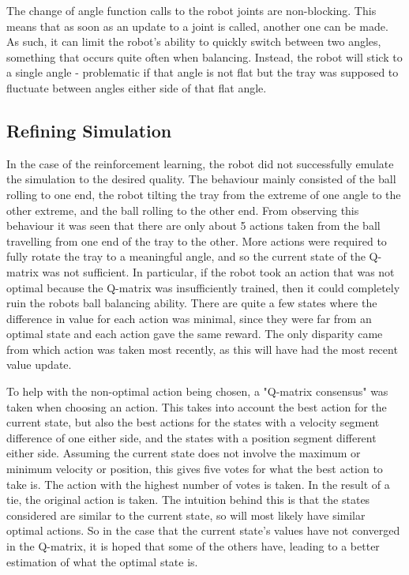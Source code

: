 \documentclass[12pt,a4paper]{article}
\begin{document}
The change of angle function calls to the robot joints are non-blocking. This means that as soon as an update to a joint is called, another one can be made. As such, it can limit the robot's ability to quickly switch between two angles, something that occurs quite often when balancing. Instead, the robot will stick to a single angle - problematic if that angle is not flat but the tray was supposed to fluctuate between angles either side of that flat angle. 

\subsection{Refining Simulation}
In the case of the reinforcement learning, the robot did not successfully emulate the simulation to the desired quality. The behaviour mainly consisted of the ball rolling to one end, the robot tilting the tray from the extreme of one angle to the other extreme, and the ball rolling to the other end. From observing this behaviour it was seen that there are only about 5 actions taken from the ball travelling from one end of the tray to the other. More actions were required to fully rotate the tray to a meaningful angle, and so the current state of the Q-matrix was not sufficient. In particular, if the robot took an action that was not optimal because the Q-matrix was insufficiently trained, then it could completely ruin the robots ball balancing ability. There are quite a few states where the difference in value for each action was minimal, since they were far from an optimal state and each action gave the same reward. The only disparity came from which action was taken most recently, as this will have had the most recent value update. 

To help with the non-optimal action being chosen, a "Q-matrix consensus" was taken when choosing an action. This takes into account the best action for the current state, but also the best actions for the states with a velocity segment difference of one either side, and the states with a position segment different either side. Assuming the current state does not involve the maximum or minimum velocity or position, this gives five votes for what the best action to take is. The action with the highest number of votes is taken. In the result of a tie, the original action is taken. The intuition behind this is that the states considered are similar to the current state, so will most likely have similar optimal actions. So in the case that the current state's values have not converged in the Q-matrix, it is hoped that some of the others have, leading to a better estimation of what the optimal state is. 
\end{document}
